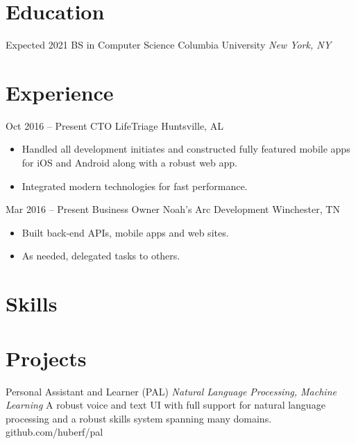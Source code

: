 \documentclass[letterpaper]{moderncv}        %
\begin{document}
\makecvtitle
\section{Education}
\cventry
{Expected 2021}
{BS in Computer Science}
{Columbia University}
{}
{\textit{New York, NY}}
{}
\section{Experience}
\cventry
{Oct 2016 -- Present}
{CTO}
{LifeTriage}
{Huntsville, AL}
{}
{\begin{itemize}%
	\item Handled all development initiates and constructed fully featured mobile apps for iOS and Android along with a robust web app.
	\item Integrated modern technologies for fast performance.
	\end{itemize}}
\cventry
{Mar 2016 -- Present}
{Business Owner}
{Noah's Arc Development}
{Winchester, TN}
{}
{\begin{itemize}%
	\item  Built back-end APIs, mobile apps and web sites.
	\item  As needed, delegated tasks to others.
	\end{itemize}}
\section{Skills}
\section{Projects}
\cventry
{}
{Personal Assistant and Learner (PAL)}
{}
{\textit{Natural Language Processing, Machine Learning}}
{}
{A robust voice and text UI with full support for natural language processing and a robust skills system spanning many domains.\\github.com/huberf/pal}
\vspace{1mm}
    
\ 
\end{document}
